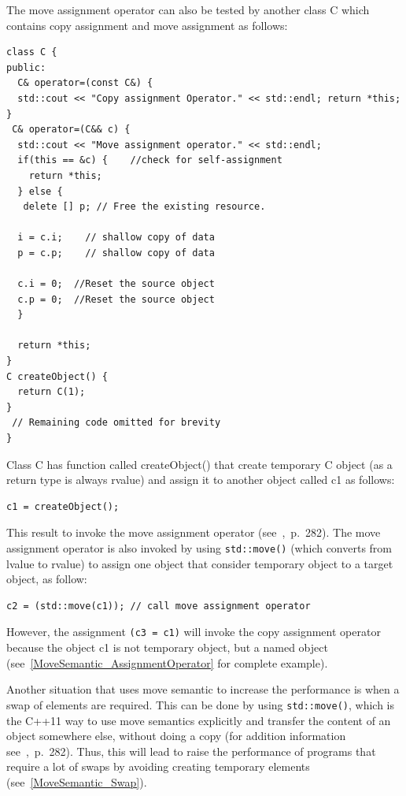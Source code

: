 \documentclass[11pt]{report}
\begin{document}
The move assignment operator can also be tested by another class C which contains copy assignment and move assignment as follows:
\begin{lstlisting}
class C {
public:
  C& operator=(const C&) { 
  std::cout << "Copy assignment Operator." << std::endl; return *this; 
}
 C& operator=(C&& c) {
  std::cout << "Move assignment operator." << std::endl;
  if(this == &c) {    //check for self-assignment
    return *this;
  } else {
   delete [] p; // Free the existing resource.

  i = c.i;    // shallow copy of data
  p = c.p;    // shallow copy of data

  c.i = 0;  //Reset the source object
  c.p = 0;  //Reset the source object
  }
  
  return *this; 
}
C createObject() {
  return C(1);
}
 // Remaining code omitted for brevity
}
\end{lstlisting}
Class C has function called createObject() that create temporary C object (as a return type is always rvalue) and assign it to another object called c1 as follows:
\begin{lstlisting}
c1 = createObject();
\end{lstlisting}
This result to invoke the move assignment operator (see~\cite{Gregorie:professionalcpp},~p.~282). The move assignment operator is also invoked by using \texttt{std::move()} (which converts from lvalue to rvalue) to assign one object that consider temporary object to a target object, as follow:
\begin{lstlisting}
c2 = (std::move(c1)); // call move assignment operator
\end{lstlisting}
However, the assignment \texttt{(c3 = c1)} will invoke the copy assignment operator because the object c1 is not temporary object, but a named object (see~\ref{MoveSemantic_AssignmentOperator} for complete example).

Another situation that uses move semantic to increase the performance is when a swap of elements are required. This can be done by using \texttt{std::move()}, which is the C++11 way to use move semantics explicitly and transfer the content of an object somewhere else, without doing a copy (for addition information see~\cite{Gregorie:professionalcpp},~p.~282). Thus, this will lead to raise the performance of programs that require a lot of swaps by avoiding creating temporary elements (see~\ref{MoveSemantic_Swap}).

\end{document}
